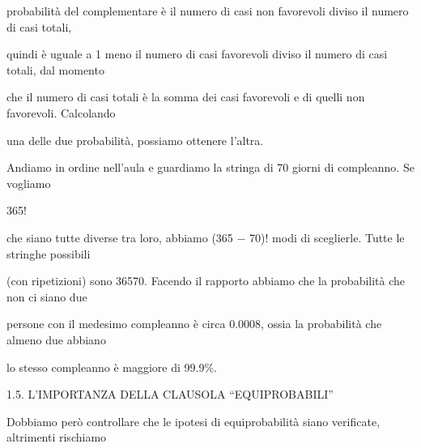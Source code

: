 \documentclass[a4paper,portrait,12pt]{article}
\begin{document}
\begin{flushleft}
probabilit\`{a} del complementare \`{e} il numero di casi non favorevoli diviso il numero di casi totali,
\end{flushleft}


\begin{flushleft}
quindi \`{e} uguale a 1 meno il numero di casi favorevoli diviso il numero di casi totali, dal momento
\end{flushleft}


\begin{flushleft}
che il numero di casi totali \`{e} la somma dei casi favorevoli e di quelli non favorevoli. Calcolando
\end{flushleft}


\begin{flushleft}
una delle due probabilit\`{a}, possiamo ottenere l'altra.
\end{flushleft}


\begin{flushleft}
Andiamo in ordine nell'aula e guardiamo la stringa di 70 giorni di compleanno. Se vogliamo
\end{flushleft}


365!


\begin{flushleft}
che siano tutte diverse tra loro, abbiamo (365 $-$ 70)! modi di sceglierle. Tutte le stringhe possibili
\end{flushleft}


\begin{flushleft}
(con ripetizioni) sono 36570. Facendo il rapporto abbiamo che la probabilit\`{a} che non ci siano due
\end{flushleft}


\begin{flushleft}
persone con il medesimo compleanno \`{e} circa 0.0008, ossia la probabilit\`{a} che almeno due abbiano
\end{flushleft}


\begin{flushleft}
lo stesso compleanno \`{e} maggiore di 99.9\%.
\end{flushleft}





\begin{flushleft}
1.5. L'IMPORTANZA DELLA CLAUSOLA {``}EQUIPROBABILI''
\end{flushleft}


\begin{flushleft}
Dobbiamo per\`{o} controllare che le ipotesi di equiprobabilit\`{a} siano verificate, altrimenti rischiamo
\end{flushleft}
\end{document}
